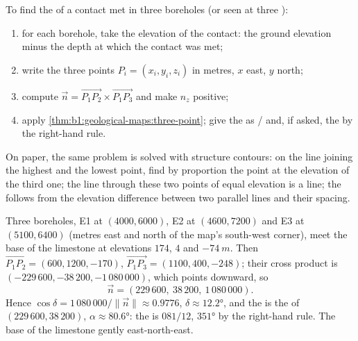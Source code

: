 \begin{method}\label{met:b1:geological-maps:three-point}
To find the  of a contact met in three boreholes (or seen at three
):
\begin{enumerate}
  \item for each borehole, take the elevation of the contact: the ground
        elevation minus the depth at which the contact was met;
  \item write the three points $P_i = (x_i, y_i, z_i)$ in metres, $x$ east,
        $y$ north;
  \item compute $\vec n = \overrightarrow{P_1P_2} \times
        \overrightarrow{P_1P_3}$ and make $n_z$ positive;
  \item apply \cref{thm:b1:geological-maps:three-point}; give the 
        as / and, if asked, the  by the right-hand
        rule.
\end{enumerate}
On paper, the same problem is solved with structure contours: on the line
joining the highest and the lowest point, find by proportion the point at
the elevation of the third one; the line through these two points of equal
elevation is a  line; the  follows from the elevation difference
between two parallel  lines and their spacing.
\end{method}

\begin{example}\label{ex:b1:geological-maps:east}
Three boreholes, E1 at $(4000, 6000)$, E2 at $(4600, 7200)$ and E3 at
$(5100, 6400)$ (metres east and north of the map's south-west corner), meet
the base of the limestone at elevations $174$, $4$ and $\qty{-74}{m}$. Then
$\overrightarrow{P_1P_2} = (600, 1200, -170)$,
$\overrightarrow{P_1P_3} = (1100, 400, -248)$; their cross product is
$(-229\,600, -38\,200, -1\,080\,000)$, which points downward, so
\[
  \vec n = (229\,600,\ 38\,200,\ 1\,080\,000).
\]
Hence $\cos\delta = 1\,080\,000/\|\vec n\| \approx
0.9776$, $\delta \approx \ang{12.2}$, and the  is the  of
$(229\,600, 38\,200)$, $\alpha \approx \ang{80.6}$: the  is
$081/12$,  $\ang{351}$ by the right-hand rule. The base of the
limestone  gently east-north-east.
\end{example}

